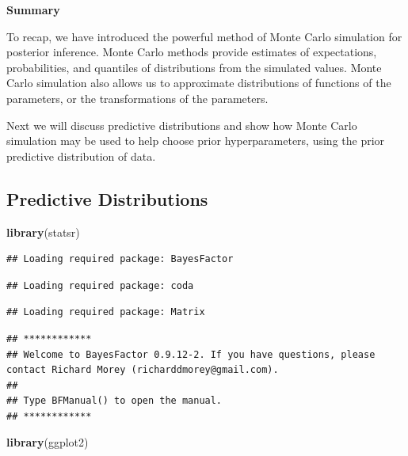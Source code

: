 \documentclass[]{book}
\newenvironment{Shaded}{\begin{snugshade}}{\end{snugshade}}
\newcommand{\KeywordTok}[1]{\textcolor[rgb]{0.13,0.29,0.53}{\textbf{{#1}}}}
\newcommand{\NormalTok}[1]{{#1}}
\theoremstyle{definition}
\theoremstyle{definition}
\theoremstyle{definition}
\theoremstyle{remark}
\begin{document}
\textbf{Summary}

To recap, we have introduced the powerful method of Monte Carlo
simulation for posterior inference. Monte Carlo methods provide
estimates of expectations, probabilities, and quantiles of distributions
from the simulated values. Monte Carlo simulation also allows us to
approximate distributions of functions of the parameters, or the
transformations of the parameters.

Next we will discuss predictive distributions and show how Monte Carlo
simulation may be used to help choose prior hyperparameters, using the
prior predictive distribution of data.

\subsection{Predictive Distributions}\label{sec:NG-predictive}

\begin{Shaded}
\begin{Highlighting}[]
\KeywordTok{library}\NormalTok{(statsr)}
\end{Highlighting}
\end{Shaded}

\begin{verbatim}
## Loading required package: BayesFactor
\end{verbatim}

\begin{verbatim}
## Loading required package: coda
\end{verbatim}

\begin{verbatim}
## Loading required package: Matrix
\end{verbatim}

\begin{verbatim}
## ************
## Welcome to BayesFactor 0.9.12-2. If you have questions, please contact Richard Morey (richarddmorey@gmail.com).
## 
## Type BFManual() to open the manual.
## ************
\end{verbatim}

\begin{Shaded}
\begin{Highlighting}[]
\KeywordTok{library}\NormalTok{(ggplot2)}
\end{Highlighting}
\end{Shaded}
\end{document}
